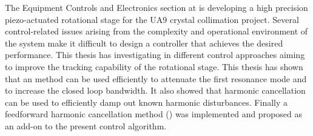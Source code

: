 The Equipment Controls and Electronics section at \abbrCERN is developing a high precision piezo-actuated rotational stage for the UA9 crystal collimation project. Several control-related issues arising from the complexity and operational environment of the system make it difficult to design a controller that achieves the desired performance. This thesis has investigating in different control approaches aiming to improve the tracking capability of the rotational stage. This thesis has shown that an \abbrIRC method can be used efficiently to attenuate the first resonance mode and to increase the closed loop bandwidth. It also showed that harmonic cancellation can be used to efficiently damp out known harmonic disturbances. Finally a feedforward harmonic cancellation method (\abbrRFDC) was implemented and proposed as an add-on to the present control algorithm.

